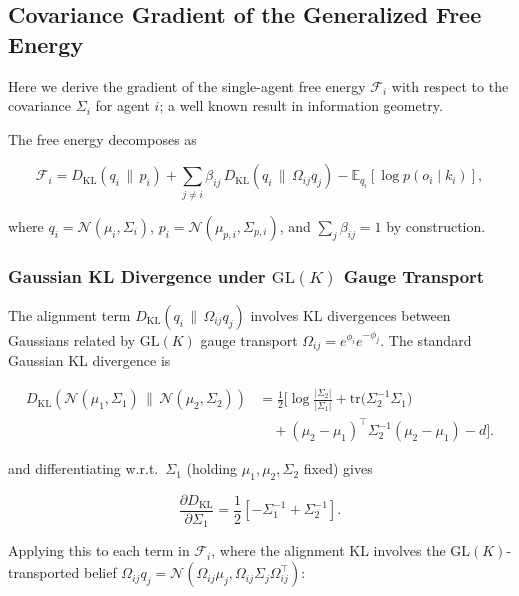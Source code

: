 \documentclass[twoside,11pt]{article}
\begin{document}
\subsection{Covariance Gradient of the Generalized Free Energy}

Here we derive the gradient of the single-agent free energy $\mathcal{F}_i$ with respect to the covariance $\Sigma_i$ for agent $i$; a well known result in information geometry.

The free energy decomposes as

\begin{equation}
\mathcal{F}_i
=D_{\mathrm{KL}}(q_i \,\|\, p_i)
+ \sum_{j \neq i} \beta_{ij}\,
D_{\mathrm{KL}}(q_i \,\|\, \Omega_{ij} q_j)
- \mathbb{E}_{q_i}[\log p(o_i \mid k_i)],
\end{equation}

where $q_i = \mathcal{N}(\mu_i, \Sigma_i)$, $p_i = \mathcal{N}(\mu_{p,i}, \Sigma_{p,i})$, and $\sum_j \beta_{ij} = 1$ by construction.

\subsubsection{Gaussian KL Divergence under $\mathrm{GL}(K)$ Gauge Transport}

The alignment term $D_{\mathrm{KL}}(q_i \,\|\, \Omega_{ij} q_j)$ involves KL divergences between Gaussians related by $\mathrm{GL}(K)$ gauge transport $\Omega_{ij} = e^{\phi_i}e^{-\phi_j}$. The standard Gaussian KL divergence is

\begin{align}
D_{\mathrm{KL}}\!\left(
\mathcal{N}(\mu_1, \Sigma_1)
\,\|\, 
\mathcal{N}(\mu_2, \Sigma_2)
\right)
&=
\frac{1}{2}
\Big[
\log \frac{|\Sigma_2|}{|\Sigma_1|}
+ \mathrm{tr}\!\big(\Sigma_2^{-1}\Sigma_1\big)
\\ &\quad
+ (\mu_2 - \mu_1)^\top
  \Sigma_2^{-1}
  (\mu_2 - \mu_1)
- d
\Big].
\label{eq:gaussian_KL}
\end{align}


and differentiating w.r.t.\ $\Sigma_1$ (holding $\mu_1,\mu_2,\Sigma_2$ fixed) gives

\begin{equation}
\frac{\partial D_{\mathrm{KL}}}{\partial \Sigma_1}
=\frac{1}{2}\left[
-\Sigma_1^{-1}
+ \Sigma_2^{-1}
\right].
\end{equation}

Applying this to each term in $\mathcal{F}_i$, where the alignment KL involves the $\mathrm{GL}(K)$-transported belief $\Omega_{ij} q_j = \mathcal{N}(\Omega_{ij}\mu_j, \Omega_{ij}\Sigma_j\Omega_{ij}^\top)$:
\end{document}

